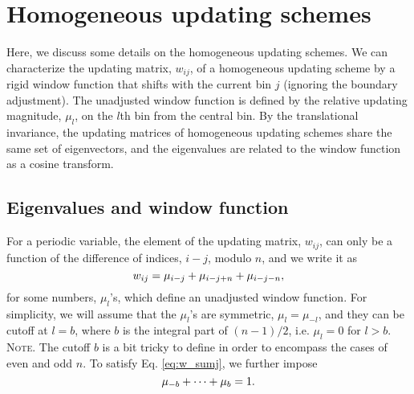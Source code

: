 \documentclass[reprint, superscriptaddress, floatfix]{revtex4-1}
\newcommand{\note}[1]{{\color{DarkGreen}\footnotesize \textsc{Note.} #1}}
\begin{document}
\section{\label{sec:homo}
Homogeneous updating schemes
}


Here, we discuss some details
on the homogeneous updating schemes.
%
We can characterize
the updating matrix, $w_{ij}$,
of a homogeneous updating scheme
by a rigid window function
that shifts with the current bin $j$
(ignoring the boundary adjustment).
%
The unadjusted window function is defined by
the relative updating magnitude, $\mu_l$,
on the $l$th bin from the central bin.
%
%
By the translational invariance,
the updating matrices of homogeneous updating schemes
share the same set of eigenvectors,
and the eigenvalues
are related to the window function as a cosine transform.



\subsection{\label{sec:wband_eig}
Eigenvalues and window function}



For a periodic variable\cite{dama2014},
the element of the updating matrix, $w_{ij}$,
can only be a function of the difference of indices, $i-j$, modulo $n$,
and we write it as
%
\begin{equation}
  w_{ij}
  =
  \mu_{i-j}
  +
  \mu_{i-j+n}
  +
  \mu_{i-j-n}
  ,
  \notag
\end{equation}
%
for some numbers, $\mu_l$'s, which
define an unadjusted window function.
%
For simplicity, we will assume that
the $\mu_l$'s are symmetric, $\mu_l = \mu_{-l}$,
and they can be cutoff at $l = b$,
where $b$ is the integral part of $(n-1)/2$,
i.e. $\mu_l = 0$ for $l > b$.
%
\note{The cutoff $b$ is a bit tricky to define
in order to encompass the cases of even and odd $n$.}%
%
To satisfy Eq. \eqref{eq:w_sumj}, we further impose
%
\begin{equation}
  \mu_{-b} + \cdots + \mu_b = 1
  .
  \notag
\end{equation}
\end{document}
